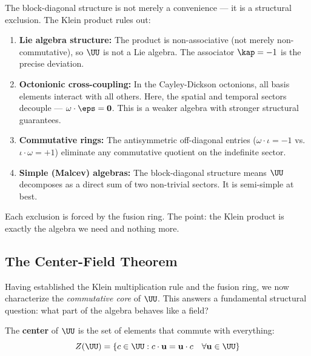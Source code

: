\begin{remark}\label{rem:exclusion}
The block-diagonal structure is not merely a convenience --- it is a structural exclusion. The Klein product rules out:
\begin{enumerate}
\item \textbf{Lie algebra structure:} The product is non-associative (not merely non-commutative), so $\UU$ is not a Lie algebra. The associator $\kap = -1$ is the precise deviation.
\item \textbf{Octonionic cross-coupling:} In the Cayley-Dickson octonions, all basis elements interact with all others. Here, the spatial and temporal sectors decouple --- $\omega \cdot \eps = \mathbf{0}$. This is a weaker algebra with stronger structural guarantees.
\item \textbf{Commutative rings:} The antisymmetric off-diagonal entries ($\omega \cdot \iota = -1$ vs.\ $\iota \cdot \omega = +1$) eliminate any commutative quotient on the indefinite sector.
\item \textbf{Simple (Malcev) algebras:} The block-diagonal structure means $\UU$ decomposes as a direct sum of two non-trivial sectors. It is semi-simple at best.
\end{enumerate}
Each exclusion is forced by the fusion ring. The point: the Klein product is exactly the algebra we need and nothing more.
\end{remark}


\subsection{The Center-Field Theorem}\label{sec:center-field}

Having established the Klein multiplication rule and the fusion ring, we now characterize the \emph{commutative core} of $\UU$. This answers a fundamental structural question: what part of the algebra behaves like a field?

\begin{definition}[Center of $\UU$]\label{def:center}
The \textbf{center} of $\UU$ is the set of elements that commute with everything:
$$Z(\UU) = \{c \in \UU : c \cdot \mathbf{u} = \mathbf{u} \cdot c \quad \forall \mathbf{u} \in \UU\}$$
\end{definition}

